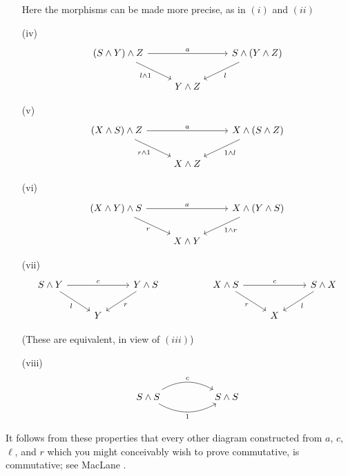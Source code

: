 \documentclass[../main]{subfiles}
\begin{document}
\begin{enumerate}
    Here the morphisms can be made more precise, as in $(i)$ and $(ii)$
    \item[(iv)] \[\begin{tikzcd}
	{(S\wedge Y)\wedge Z} && {S\wedge(Y\wedge Z)} \\
	& {Y\wedge Z}
	\arrow["a", from=1-1, to=1-3]
	\arrow["l\wedge 1"', from=1-1, to=2-2]
	\arrow["l", from=1-3, to=2-2]
    \end{tikzcd}\]
    \item[(v)]\[\begin{tikzcd}
	{(X\wedge S)\wedge Z} && {X\wedge(S\wedge Z)} \\
	& {X\wedge Z}
	\arrow["a", from=1-1, to=1-3]
	\arrow["r\wedge 1"', from=1-1, to=2-2]
	\arrow["1\wedge l", from=1-3, to=2-2]
    \end{tikzcd}\]
    \item[(vi)]\[\begin{tikzcd}
	{(X\wedge Y)\wedge S} && {X\wedge(Y\wedge S)} \\
	& {X\wedge Y}
	\arrow["a", from=1-1, to=1-3]
	\arrow["r"', from=1-1, to=2-2]
	\arrow["1\wedge r", from=1-3, to=2-2]
    \end{tikzcd}\]
    \item[(vii)]\[\begin{tikzcd}
	{S\wedge Y} && {Y\wedge S} && {X\wedge S} && {S\wedge X} \\
	& Y &&&& X
	\arrow["c", from=1-1, to=1-3]
	\arrow["l"', from=1-1, to=2-2]
	\arrow["r", from=1-3, to=2-2]
	\arrow["c", from=1-5, to=1-7]
	\arrow["r"', from=1-5, to=2-6]
	\arrow["l", from=1-7, to=2-6]
    \end{tikzcd}\]
    
    (These are equivalent, in view of $(iii)$)
    \item[(viii)] \[\begin{tikzcd}
	{S\wedge S} && {S\wedge S}
	\arrow["c", bend left=30, from=1-1, to=1-3]
	\arrow["1"', bend right=30, from=1-1, to=1-3]
    \end{tikzcd}\]
\end{enumerate}



It follows from these properties that every other diagram constructed from $a$, $c$, $\ell$, and $r$ which you might conceivably wish to prove commutative, is commutative; see MacLane \cite{maclane}.
\end{document}
